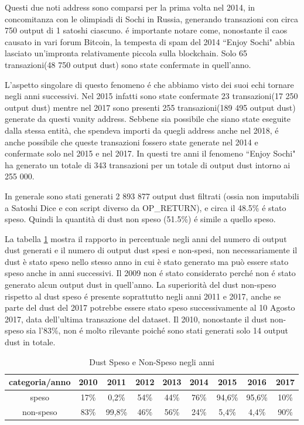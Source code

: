 Questi due noti address sono comparsi per la prima volta nel 2014, in concomitanza con le olimpiadi di Sochi in Russia, generando transazioni con circa 750 output di 1 satoshi ciascuno. é importante notare come, nonostante il caos causato in vari forum Bitcoin, la tempesta di spam del 2014 ``Enjoy Sochi" abbia lasciato un'impronta relativamente piccola sulla blockchain. Solo 65 transazioni(48 750 output dust) sono state confermate in quell'anno.

L'aspetto singolare di questo fenomeno é che abbiamo visto dei suoi echi tornare negli anni successivi. Nel 2015 infatti sono state confermate 23 transazioni(17 250 output dust) mentre nel 2017 sono presenti 255 transazioni(189 495 output dust) generate da questi vanity address. Sebbene sia possibile che siano state eseguite dalla stessa entità, che spendeva importi da quegli address anche nel 2018, é anche possibile che queste transazioni fossero state generate nel 2014 e confermate solo nel 2015 e nel 2017. In questi tre anni il fenomeno ``Enjoy Sochi" ha generato un totale di 343 transazioni per un totale di output dust intorno ai 255 000.

In generale sono stati generati 2 893 877 output dust filtrati (ossia non imputabili a Satoshi Dice e con script diverso da OP\_RETURN), e circa il 48.5\% é stato speso. Quindi la quantità di dust non speso (51.5\%) é simile a quello speso. 

La tabella \ref{tab:dust_spent_unspent} mostra il rapporto in percentuale negli anni del numero di output dust generati e il numero di output dust spesi e non-spesi, non necessariamente il dust è stato speso nello stesso anno in cui è stato generato ma può essere stato speso anche in anni successivi. Il 2009 non é stato considerato perché non é stato generato alcun output dust in quell'anno. La superiorità del dust non-speso rispetto al dust speso é presente soprattutto negli anni 2011 e 2017, anche se parte del dust del 2017 potrebbe essere stato speso successivamente al 10 Agosto 2017, data dell'ultima transazione del dataset. Il 2010, nonostante il dust non-speso sia l'83\%, non é molto rilevante poiché sono stati generati solo 14 output dust in totale. 
\begin{table}[H]
    \centering
    \begin{tabular}{|c|c|c|c|c|c|c|c|c|}
        \hline
           categoria/anno   & 2010 & 2011 & 2012 & 2013 & 2014 & 2015 & 2016 & 2017\\
        \hline 
         speso &  17\% & 0,2\% & 54\% & 44\% & 76\% & 94,6\% & 95,6\% & 10\% \\
         \hline
         non-speso & 83\% & 99,8\% & 46\% & 56\% & 24\% & 5,4\% & 4,4\% & 90\%  \\
         \hline
    \end{tabular}
    \caption{Dust Speso e Non-Speso negli anni}
    \label{tab:dust_spent_unspent}
\end{table}
